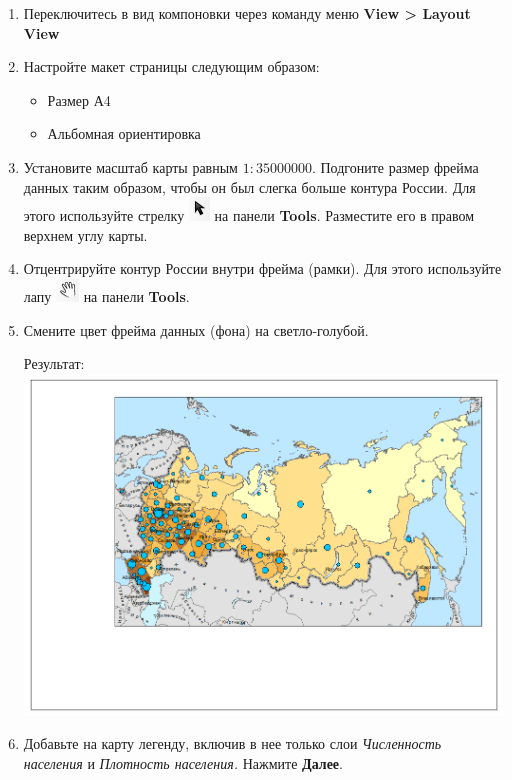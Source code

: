 \documentclass[]{book}
\providecommand{\tightlist}{%
  \setlength{\itemsep}{0pt}\setlength{\parskip}{0pt}}
\theoremstyle{definition}
\theoremstyle{definition}
\theoremstyle{definition}
\theoremstyle{remark}
\begin{document}
\begin{enumerate}
\def\labelenumi{\arabic{enumi}.}
\item
  Переключитесь в вид компоновки через команду меню \textbf{View
  \textgreater{} Layout View}
\item
  Настройте макет страницы следующим образом:

  \begin{itemize}
  \tightlist
  \item
    Размер А4
  \item
    Альбомная ориентировка
  \end{itemize}
\item
  Установите масштаб карты равным \(1:35 000 000\). Подгоните размер
  фрейма данных таким образом, чтобы он был слегка больше контура
  России. Для этого используйте стрелку
  \includegraphics{images/Ex04/image29.png} на панели \textbf{Tools}.
  Разместите его в правом верхнем углу карты.
\item
  Отцентрируйте контур России внутри фрейма (рамки). Для этого
  используйте лапу \includegraphics{images/Ex04/image30.png} на панели
  \textbf{Tools}.
\item
  Смените цвет фрейма данных (фона) на светло-голубой.

  Результат: \includegraphics{images/Ex04/image31.png}
\item
  Добавьте на карту легенду, включив в нее только слои \emph{Численность
  населения} и \emph{Плотность населения.} Нажмите \textbf{Далее}.


\end{enumerate}
\end{document}
